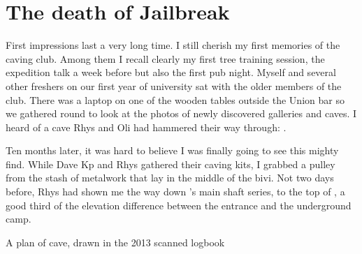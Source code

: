 \section{The death of Jailbreak}
	First impressions last a very long time. I still cherish my first memories of the caving club. Among them I recall clearly my first tree training session, the expedition talk a week before but also the first pub night. Myself and several other freshers on our first year of university sat with the older members of the club. There was a laptop on one of the wooden tables outside the Union bar so we gathered round to look at the photos of newly discovered galleries and caves. I heard of a cave Rhys and Oli had hammered their way through: .

	Ten months later, it was hard to believe I was finally going to see this mighty find. While Dave Kp and Rhys gathered their caving kits, I grabbed a pulley from the stash of metalwork that lay in the middle of the bivi. Not two days before, Rhys had shown me the way down 's main shaft series, to the top of , a good third of the elevation difference between the entrance and the underground camp.
		\begin{pagefigure}
		\checkoddpage \ifoddpage \forcerectofloat \else \forceversofloat \fi
		\centering
			\caption{A plan of \protect{} cave, drawn in the 2013 scanned logbook }\label{fig:jailbreak}
		\end{pagefigure}
		
